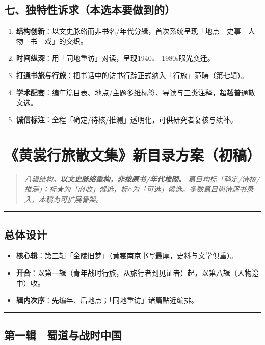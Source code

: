 \documentclass[UTF8,fontset=none,zihao=-4,a4paper]{ctexart}
\begin{document}
\subsection{七、独特性诉求（本选本要做到的）}


\begin{enumerate}
\item \textbf{结构创新}：以文史脉络而非书名/年代分辑，首次系统呈现「地点—史事—人物—书—戏」的交织。
\item \textbf{时间纵深}：用「同地重访」对读，呈现1940s—1980s眼光变迁。
\item \textbf{打通书旅与行旅}：把书话中的访书行踪正式纳入「行旅」范畴（第七辑）。
\item \textbf{学术配套}：编年篇目表、地点/主题多维标签、导读与三类注释，超越普通散文选。
\item \textbf{诚信标注}：全程「确定/待核/推测」透明化，可供研究者复核与续补。
\end{enumerate}


\section{《黄裳行旅散文集》新目录方案（初稿）}


\begin{quote}\small\itshape
八辑结构。\textbf{以文史脉络重构，非按原书/年代堆砌。} 篇目均标「确定/待核/推测」；标★为「必收」候选，标○为「可选」候选。多数篇目尚待逐书录入，本稿为可扩展骨架。
\end{quote}

\medskip\hrule\medskip

\subsection{总体设计}


\begin{itemize}
\item \textbf{核心辑}：第三辑「金陵旧梦」（黄裳南京书写最厚，史料与文学俱重）。
\item \textbf{开合}：以第一辑（青年战时行旅，从旅行者到见证者）起，以第八辑（人物途中）收。
\item \textbf{辑内次序}：先编年、后地点；「同地重访」诸篇贴近编排。
\end{itemize}


\medskip\hrule\medskip

\subsection{第一辑　蜀道与战时中国}
\end{document}
